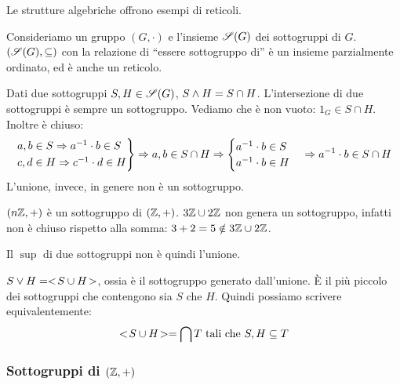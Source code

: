 Le strutture algebriche offrono esempi di reticoli.

Consideriamo un gruppo $(G, \cdot)$ e l'insieme $\mathscr{S}(G)$ dei sottogruppi di $G$. $(\mathscr{S}(G), \subseteq)$ con la relazione di ``essere sottogruppo di'' \`e un insieme parzialmente ordinato, ed \`e anche un reticolo.

Dati due sottogruppi $S, H \in \mathscr{S}(G)$, $S \wedge H = S \cap H$. L'intersezione di due sottogruppi \`e sempre un sottogruppo. Vediamo che \`e non vuoto: $1_G \in S \cap H$. Inoltre \`e chiuso:
\[
\begin{rcases*}
a, b \in S \implies a^{-1} \cdot b \in S \\
c, d \in H \implies c^{-1} \cdot d \in H
\end{rcases*}
\implies
a, b \in S \cap H \implies 
\begin{cases}
a^{-1} \cdot b \in S  \\
a^{-1} \cdot b \in H
\end{cases}
\implies
a^{-1} \cdot b \in S \cap H
\]
L'unione, invece, in genere non \`e un sottogruppo.

$(n \mathbb{Z}, +)$ \`e un sottogruppo di $(\mathbb{Z}, +)$. $3 \mathbb{Z} \cup 2 \mathbb{Z}$ non genera un sottogruppo, infatti non \`e chiuso rispetto alla somma: $3 + 2 = 5 \notin 3 \mathbb{Z} \cup 2 \mathbb{Z}$.

Il $\sup$ di due sottogruppi non \`e quindi l'unione.

$S \vee H = <\!{S \cup H}\!>$, ossia \`e il sottogruppo generato dall'unione. \`E il pi\`u piccolo dei sottogruppi che contengono sia $S$ che $H$. Quindi possiamo scrivere equivalentemente:
\[
<\!{S \cup H}\!> = \bigcap T \text{ tali che } S, H \subseteq T
\]

\subsubsection{Sottogruppi di $(\mathbb{Z}, +)$}

